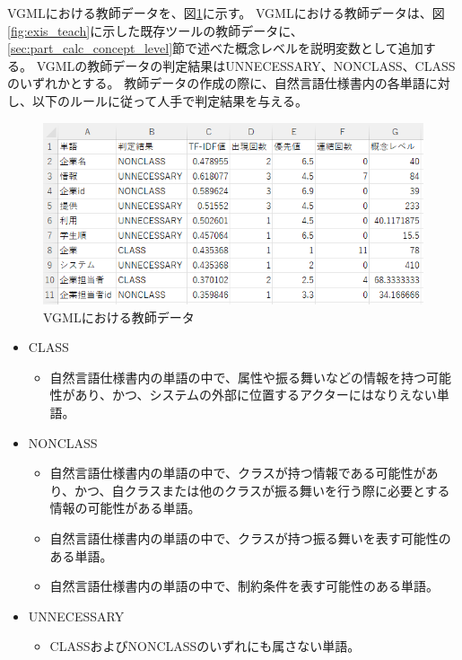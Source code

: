 VGMLにおける教師データを、図\ref{fig:vgml_teach}に示す。
VGMLにおける教師データは、図\ref{fig:exis_teach}に示した既存ツールの教師データに、\ref{sec:part_calc_concept_level}節で述べた概念レベルを説明変数として追加する。
VGMLの教師データの判定結果はUNNECESSARY、NONCLASS、CLASSのいずれかとする。
教師データの作成の際に、自然言語仕様書内の各単語に対し、以下のルールに従って人手で判定結果を与える。

\begin{figure}[t]
    \begin{center}
        \includegraphics[width=1.0\columnwidth]{image/vgml_teach.png}
        \caption{VGMLにおける教師データ}
        \label{fig:vgml_teach}
    \end{center}
\end{figure}

\begin{itemize}
    \item CLASS
        \begin{itemize}
            \item 自然言語仕様書内の単語の中で、属性や振る舞いなどの情報を持つ可能性があり、かつ、システムの外部に位置するアクターにはなりえない単語。
        \end{itemize}
    \item NONCLASS
        \begin{itemize}
            \item 自然言語仕様書内の単語の中で、クラスが持つ情報である可能性があり、かつ、自クラスまたは他のクラスが振る舞いを行う際に必要とする情報の可能性がある単語。
            \item 自然言語仕様書内の単語の中で、クラスが持つ振る舞いを表す可能性のある単語。
            \item 自然言語仕様書内の単語の中で、制約条件を表す可能性のある単語。
        \end{itemize}
    \item UNNECESSARY
        \begin{itemize}
            \item CLASSおよびNONCLASSのいずれにも属さない単語。
        \end{itemize}
\end{itemize}

